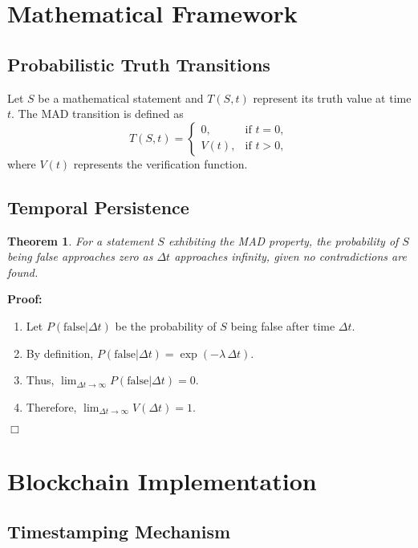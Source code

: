 \documentclass[11pt]{article}
\newtheorem{theorem}{Theorem}[section]
\begin{document}
\section{Mathematical Framework}

\subsection{Probabilistic Truth Transitions}

Let $S$ be a mathematical statement and $T(S,t)$ represent its truth value at time $t$. The MAD transition is defined as
\[
T(S,t) = \begin{cases}
0, & \text{if } t = 0, \\
V(t), & \text{if } t > 0,
\end{cases}
\]
where $V(t)$ represents the verification function.

\subsection{Temporal Persistence}

\begin{theorem}
For a statement $S$ exhibiting the MAD property, the probability of $S$ being false approaches zero as $\Delta t$ approaches infinity, given no contradictions are found.
\end{theorem}

\noindent\textbf{Proof:} 
\begin{enumerate}[label=(\roman*)]
    \item Let $P(\text{false}|\Delta t)$ be the probability of $S$ being false after time $\Delta t$.
    \item By definition, $P(\text{false}|\Delta t)=\exp(-\lambda\,\Delta t)$.
    \item Thus, $\displaystyle \lim_{\Delta t \to \infty}P(\text{false}|\Delta t) = 0$.
    \item Therefore, $\displaystyle \lim_{\Delta t \to \infty} V(\Delta t) = 1$.
\end{enumerate}
\hfill $\Box$

\section{Blockchain Implementation}

\subsection{Timestamping Mechanism}
\end{document}
